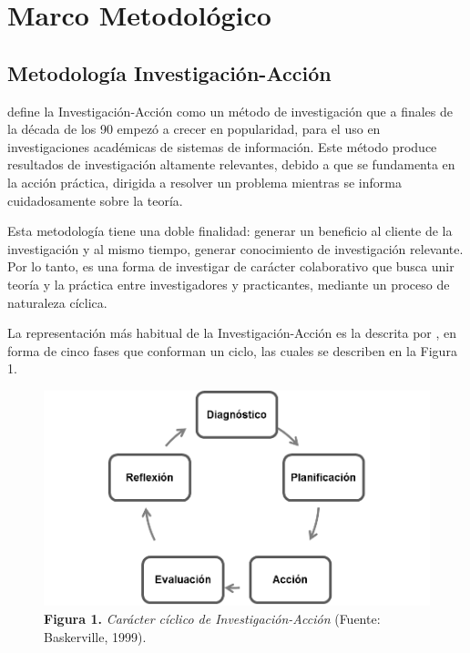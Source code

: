 \chapter{\label{cap:3}Marco Metodol\'{o}gico}

	\section{Metodolog\'{i}a Investigaci\'{o}n-Acci\'{o}n}
	\cite{Baskerville} define la Investigaci\'{o}n-Acci\'{o}n como un m\'{e}todo de investigaci\'{o}n que a finales de la d\'{e}cada de los 90 empez\'{o} a crecer en popularidad, para el uso en investigaciones acad\'{e}micas de sistemas de informaci\'{o}n. Este m\'{e}todo produce resultados de investigaci\'{o}n altamente relevantes, debido a que se fundamenta en la acci\'{o}n pr\'{a}ctica, dirigida a resolver un problema mientras se informa cuidadosamente sobre la teor\'{i}a.

	Esta metodolog\'{i}a tiene una doble finalidad: generar un beneficio al cliente de la investigaci\'{o}n y al mismo tiempo, generar conocimiento de investigaci\'{o}n relevante. Por lo tanto, es una forma de investigar de car\'{a}cter colaborativo que busca unir teor\'{i}a y la pr\'{a}ctica entre investigadores y practicantes, mediante un proceso de naturaleza c\'{i}clica.

	La representaci\'{o}n m\'{a}s habitual de la Investigaci\'{o}n-Acci\'{o}n es la descrita por \cite{Baskerville}, en forma de cinco fases que conforman un ciclo, las cuales se describen en la Figura 1.

\FloatBarrier %
\vline
	\begin{figure}
		\centering
		\includegraphics[scale=0.77]{img/investigacion-accion.png}
			\caption{\textbf{Figura 1.} \textit{Car\'{a}cter c\'{i}clico de Investigaci\'{o}n-Acci\'{o}n} (Fuente: Baskerville, 1999).}
	\end{figure}
\FloatBarrier %

